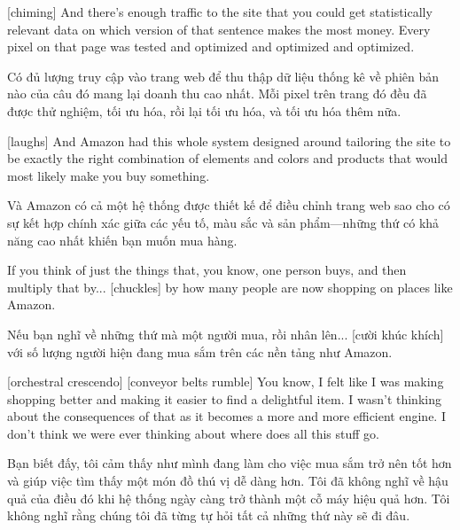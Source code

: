 \documentclass[a4paper]{article}
\begin{document}
	[chiming]
	And there's enough traffic to the site that you could get statistically relevant data on which version of that sentence makes the most money.
	Every pixel on that page was tested and optimized and optimized and optimized.
	
	\begin{vietnamese-v2}
		Có đủ lượng truy cập vào trang web để thu thập dữ liệu thống kê về phiên bản nào của câu đó mang lại doanh thu cao nhất. Mỗi pixel trên trang đó đều đã được thử nghiệm, tối ưu hóa, rồi lại tối ưu hóa, và tối ưu hóa thêm nữa.
	\end{vietnamese-v2}
	
	[laughs] And Amazon had this whole system designed around tailoring the site to be exactly the right combination of elements and colors and products that would most likely make you buy something.
	
	\begin{vietnamese-v2}
		[cười] Và Amazon có cả một hệ thống được thiết kế để điều chỉnh trang web sao cho có sự kết hợp chính xác giữa các yếu tố, màu sắc và sản phẩm—những thứ có khả năng cao nhất khiến bạn muốn mua hàng.
	\end{vietnamese-v2}
	
	
	If you think of just the things that, you know, one person buys, and then multiply that by... [chuckles] by how many people are now shopping on places like Amazon.
	
	\begin{vietnamese-v2}
		Nếu bạn nghĩ về những thứ mà một người mua, rồi nhân lên... [cười khúc khích] với số lượng người hiện đang mua sắm trên các nền tảng như Amazon.
	\end{vietnamese-v2}
	
	[orchestral crescendo]
	[conveyor belts rumble]
	You know, I felt like I was making shopping better and making it easier to find a delightful item.
	I wasn't thinking about the consequences of that as it becomes a more and more efficient engine.
	I don't think we were ever thinking about where does all this stuff go.
	
	\begin{vietnamese-v2}
		Bạn biết đấy, tôi cảm thấy như mình đang làm cho việc mua sắm trở nên tốt hơn và giúp việc tìm thấy một món đồ thú vị dễ dàng hơn. 
		Tôi đã không nghĩ về hậu quả của điều đó khi hệ thống ngày càng trở thành một cỗ máy hiệu quả hơn. 
		Tôi không nghĩ rằng chúng tôi đã từng tự hỏi tất cả những thứ này sẽ đi đâu.
	\end{vietnamese-v2}
	
\end{document}
